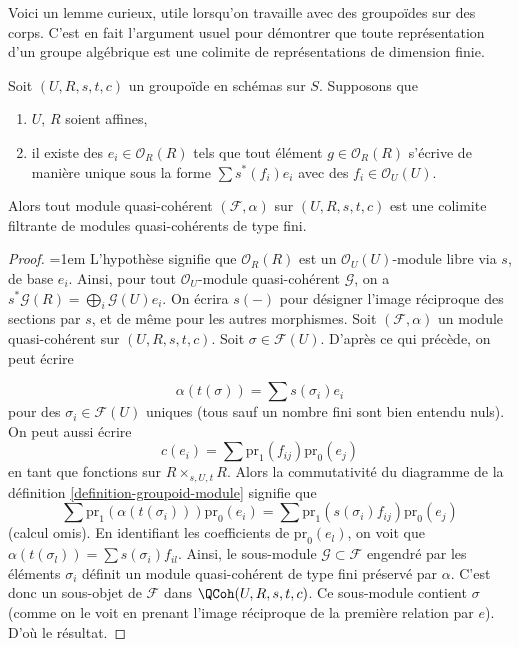 \noindent
Voici un lemme curieux, utile lorsqu'on travaille avec des groupoïdes
sur des corps. C'est en fait l'argument usuel pour démontrer que toute
représentation d'un groupe algébrique est une colimite de représentations
de dimension finie.

\begin{lemma}
\label{lemma-colimit-finite-type}
Soit $(U, R, s, t, c)$ un groupoïde en schémas sur $S$.
Supposons que
\begin{enumerate}
\item $U$, $R$ soient affines,
\item il existe des $e_i \in \mathcal{O}_R(R)$ tels que
tout élément $g \in \mathcal{O}_R(R)$ s'écrive de manière unique sous la forme
$\sum s^*(f_i)e_i$ avec des $f_i \in \mathcal{O}_U(U)$.
\end{enumerate}
Alors tout module quasi-cohérent $(\mathcal{F}, \alpha)$ sur $(U, R, s, t, c)$
est une colimite filtrante de modules quasi-cohérents de type fini.
\end{lemma}

\begin{proof}
{\emergencystretch=1em L'hypothèse signifie que $\mathcal{O}_R(R)$ est un
$\mathcal{O}_U(U)$-module libre via $s$, de base $e_i$. Ainsi,
pour tout $\mathcal{O}_U$-module quasi-cohérent $\mathcal{G}$,
on a $s^*\mathcal{G}(R) = \bigoplus_i \mathcal{G}(U)e_i$.
On écrira $s(-)$ pour désigner l'image réciproque des sections par $s$, et
de même pour les autres morphismes.
Soit $(\mathcal{F}, \alpha)$ un module quasi-cohérent sur
$(U, R, s, t, c)$. Soit $\sigma \in \mathcal{F}(U)$. D'après ce qui précède,
on peut écrire\par}
$$
\alpha(t(\sigma)) = \sum s(\sigma_i) e_i
$$
pour des $\sigma_i \in \mathcal{F}(U)$ uniques (tous sauf un nombre fini
sont bien entendu nuls). On peut aussi écrire
$$
c(e_i) = \sum \text{pr}_1(f_{ij}) \text{pr}_0(e_j)
$$
en tant que fonctions sur $R \times_{s, U, t}R$. Alors la commutativité du diagramme
de la définition \ref{definition-groupoid-module} signifie que
$$
\sum \text{pr}_1(\alpha(t(\sigma_i))) \text{pr}_0(e_i)
=
\sum \text{pr}_1(s(\sigma_i)f_{ij}) \text{pr}_0(e_j)
$$
(calcul omis). En identifiant les coefficients de $\text{pr}_0(e_l)$,
on voit que $\alpha(t(\sigma_l)) = \sum s(\sigma_i)f_{il}$. Ainsi,
le sous-module $\mathcal{G} \subset \mathcal{F}$ engendré par les
éléments $\sigma_i$ définit un module quasi-cohérent de type fini
préservé par $\alpha$. C'est donc un sous-objet de $\mathcal{F}$ dans
$\QCoh(U, R, s, t, c)$. Ce sous-module contient $\sigma$
(comme on le voit en prenant l'image réciproque de la première relation par $e$). D'où le résultat.
\end{proof}

